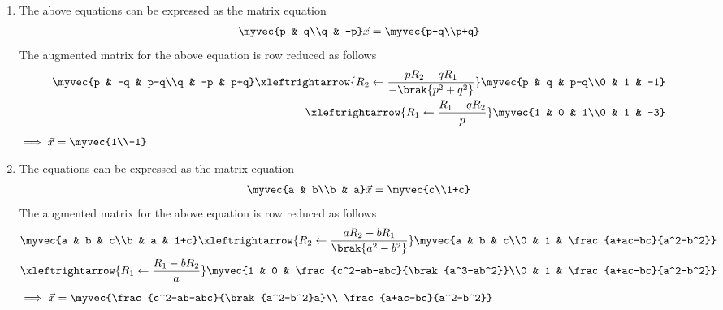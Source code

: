\begin{enumerate}
\item
The above equations can be expressed as the matrix equation
\begin{align}
\myvec{p & q\\q & -p} \vec{x} = \myvec{p-q\\p+q}
\end{align}
%
The augmented matrix for the above equation is row reduced as follows
\begin{align}
\myvec{p & -q & p-q\\q & -p & p+q} 
\xleftrightarrow {R_2\leftarrow \frac{pR_2-qR_1}{-\brak{p^2+q^2}}}\myvec{p & q & p-q\\0 & 1 & -1} 
\\
\xleftrightarrow {R_1\leftarrow \frac{R_1 -q R_2}{p}}\myvec{1 & 0 & 1\\0 & 1 & -3} 
\label{eq:3.12.1_line_aug}
\end{align}
%
$\implies \vec{x}=\myvec{1\\-1}$

\item
The equations can be expressed as the matrix equation
\begin{align}
\myvec{a & b\\b & a} \vec{x} = \myvec{c\\1+c}
\end{align}
%
The augmented matrix for the above equation is row reduced as follows
\begin{align}
\myvec{a & b & c\\b & a & 1+c} 
\xleftrightarrow {R_2\leftarrow \frac{aR_2-bR_1}{\brak{a^2-b^2}}}\myvec{a & b & c\\0 & 1 & \frac{a+ac-bc}{a^2-b^2}} 
\\
\xleftrightarrow {R_1\leftarrow \frac{R_1 -b R_2}{a}}\myvec{1 & 0 & \frac{c^2-ab-abc}{\brak{a^3-ab^2}}\\0 & 1 & \frac{a+ac-bc}{a^2-b^2}} 
\label{eq:3.12.1_line_aug1}
\end{align}
%
$\implies \vec{x}=\myvec{\frac{c^2-ab-abc}{\brak{a^2-b^2}a}\\ \frac{a+ac-bc}{a^2-b^2}}$


\end{enumerate}
